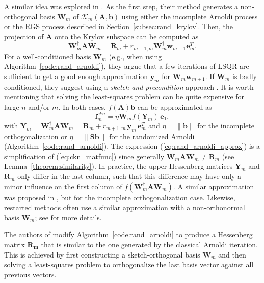 \documentclass[smallextended]{svjour3}
\renewcommand{\vec}[1]{\mathbf{#1}}
\newcommand{\mat}[1]{\mathbf{#1}}
\newcommand{\norm}[1]{\| #1 \|}
\begin{document}
A similar idea was explored in \cite{cortinovis_speeding_2024}. As the first step, their method generates a non-orthogonal basis $\mat{W}_m$ of $\mathcal{K}_m(\mat{A}, \vec{b})$ using either the incomplete Arnoldi process \cite[Chapter~6.4.2]{saad_iterative_2003} or the RGS process described in Section~\ref{subsec:rand_krylov}. Then, the projection of $\mat{A}$ onto the Krylov subspace can be computed as
\begin{equation}
\label{eq:ckn_projection}
\mat{W}_m^\dagger \mat{A} \mat{W}_m = \mat{R}_m + r_{m + 1, m} \mat{W}_{m}^\dagger \vec{w}_{m + 1} \vec{e}^T_m.
\end{equation}
For a well-conditioned basis $\mat{W}_m$ (e.g., when using Algorithm~\ref{code:rand_arnoldi}), they argue that a few iterations of LSQR \cite{paige_lsqr_1982} are sufficient to get a good enough approximation $\vec{y}_m$ for $\mat{W}_{m}^\dagger \vec{w}_{m + 1}$. If $\mat{W}_m$ is badly conditioned, they suggest using a \textit{sketch-and-precondition} approach \cite{avron_blendenpik_2010,martinsson_randomized_2020}. It is worth mentioning that solving the least-squares problem can be quite expensive for large $n$ and/or $m$. In both cases, $f(\mat{A}) \vec{b}$ can be approximated as
\begin{equation}
\label{eq:ckn_matfunc}
\vec{f}_{m}^{ckn} = \eta \mat{W}_m f(\mat{Y}_m) \, \vec{e}_1,
\end{equation}
with $\mat{Y}_m = \mat{W}_m^\dagger \mat{A} \mat{W}_m = \mat{R}_m + r_{m + 1, m} \, \vec{y}_m \, \vec{e}^T_m$ and $\eta = \norm{\vec{b}}$ for the incomplete orthogonalization or $\eta = \norm{\mat{S} \vec{b}}$ for the randomized Arnoldi (Algorithm~\ref{code:rand_arnoldi}). The expression (\ref{eq:rand_arnoldi_approx}) is a simplification of (\ref{eq:ckn_matfunc}) since generally $\mat{W}_m^\dagger \mat{A} \mat{W}_m \neq \mat{R}_m$ (see Lemma~\ref{theorem:similarity}). In practice, the upper Hessenberg matrices $\mat{Y}_m$ and $\mat{R}_m$ only differ in the last column, such that this difference may have only a minor influence on the first column of $f(\mat{W}_m^\dagger \mat{A} \mat{W}_m)$. A similar approximation was proposed in \cite[Section 3.2]{cortinovis_speeding_2024}, but for the incomplete orthogonalization case. Likewise, restarted methods often use a similar approximation with a non-orthonormal basis $\mat{W}_m$; see \cite{eiermann_restarted_2006} for more details.

The authors of \cite{grigori_restoring_2026} modify Algorithm~\ref{code:rand_arnoldi} to produce a Hessenberg matrix $\mat{R_m}$ that is similar to the one generated by the classical Arnoldi iteration. This is achieved by first constructing a sketch-orthogonal basis $\mat{W}_m$ and then solving a least-squares problem to orthogonalize the last basis vector against all previous vectors.
\end{document}
